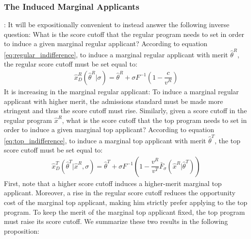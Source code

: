 \documentclass[12pt,reqno]{amsart}
\theoremstyle{definition}
\theoremstyle{plain} %
\begin{document}






\subsubsection{The Induced Marginal Applicants}: It will be expositionally convenient to instead answer the following inverse question: What is the score cutoff that the regular program needs to set in order to induce a given marginal regular applicant? According to equation \eqref{eq:regular_indifference}, to induce a marginal regular applicant with merit $\hat{\theta}^R$, the regular score cutoff must be set equal to:
\begin{align}\label{eq:reg_demand}
    \hat{x}^R_{D}(\hat{\theta}^R|\sigma) = \hat{\theta}^R + \sigma F^{-1}\left(1 - \dfrac{c}{v^R}\right)
\end{align}
It is increasing in the marginal regular applicant: To induce a marginal regular applicant with higher merit, the admissions standard must be made more stringent and thus the score cutoff must rise. Similarly, given a score cutoff in the regular program $\hat{x}^R$, what is the score cutoff that the top program needs to set in order to induce a given marginal top applicant? According to equation \eqref{eq:top_indifference}, to induce a marginal top applicant with merit $\hat{\theta}^T$, the top score cutoff must be set equal to:
\begin{align}\label{eq:top_demand}
  \hat{x}^T_{D}(\hat{\theta}^T|\hat{x}^R,\sigma) = \hat{\theta}^T + \sigma F^{-1}\left(1 - \dfrac{v^R}{v^T}\bar{F}_{\sigma}\left(\hat{x}^R|\hat{\theta}^T\right)\right)
\end{align}
First, note that a higher score cutoff induces a higher-merit marginal top applicant. Moreover, a rise in the regular score cutoff reduces the opportunity cost of the marginal top applicant, making him strictly prefer applying to the top program. To keep the merit of the marginal top applicant fixed, the top program must raise its score cutoff. We summarize these two results in the following proposition:
\end{document}
